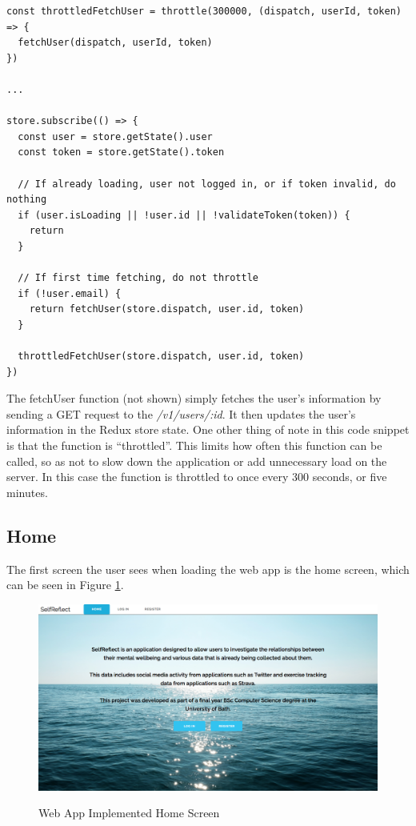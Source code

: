 \documentclass[11pt,openright,a4paper]{report}
\begin{document}
\begin{lstlisting}
const throttledFetchUser = throttle(300000, (dispatch, userId, token) => {
  fetchUser(dispatch, userId, token)
})

...

store.subscribe(() => {
  const user = store.getState().user
  const token = store.getState().token

  // If already loading, user not logged in, or if token invalid, do nothing
  if (user.isLoading || !user.id || !validateToken(token)) {
    return
  }

  // If first time fetching, do not throttle
  if (!user.email) {
    return fetchUser(store.dispatch, user.id, token)
  }

  throttledFetchUser(store.dispatch, user.id, token)
})
\end{lstlisting}

The fetchUser function (not shown) simply fetches the user's information by sending a GET request to the \emph{/v1/users/:id}. It then updates the user's information in the Redux store state. One other thing of note in this code snippet is that the function is \enquote{throttled}. This limits how often this function can be called, so as not to slow down the application or add unnecessary load on the server. In this case the function is throttled to once every 300 seconds, or five minutes.

\subsection{Home}
The first screen the user sees when loading the web app is the home screen, which can be seen in Figure \ref{fig:webhomeimpl}.

\begin{figure}[ht]
\centering
\caption{Web App Implemented Home Screen}
\includegraphics[width=.8\textwidth]{i/webhomeimpl.png}
\label{fig:webhomeimpl}
\end{figure}
\end{document}
